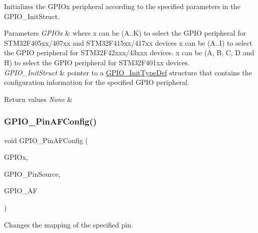 Initializes the G\+P\+I\+Ox peripheral according to the specified parameters in the G\+P\+I\+O\+\_\+\+Init\+Struct. 


\begin{DoxyParams}{Parameters}
{\em G\+P\+I\+Ox} & where x can be (A..K) to select the G\+P\+IO peripheral for S\+T\+M32\+F405xx/407xx and S\+T\+M32\+F415xx/417xx devices x can be (A..I) to select the G\+P\+IO peripheral for S\+T\+M32\+F42xxx/43xxx devices. x can be (A, B, C, D and H) to select the G\+P\+IO peripheral for S\+T\+M32\+F401xx devices. ~\newline
\\
\hline
{\em G\+P\+I\+O\+\_\+\+Init\+Struct} & pointer to a \mbox{\hyperlink{struct_g_p_i_o___init_type_def}{G\+P\+I\+O\+\_\+\+Init\+Type\+Def}} structure that contains the configuration information for the specified G\+P\+IO peripheral. \\
\hline
\end{DoxyParams}

\begin{DoxyRetVals}{Return values}
{\em None} & \\
\hline
\end{DoxyRetVals}
\mbox{\label{group___g_p_i_o_ga0a77617a322562ae84f8d72486032c5d}} 
\subsubsection{\texorpdfstring{G\+P\+I\+O\+\_\+\+Pin\+A\+F\+Config()}{GPIO\_PinAFConfig()}}
{\footnotesize\ttfamily void G\+P\+I\+O\+\_\+\+Pin\+A\+F\+Config (\begin{DoxyParamCaption}\item[{G\+P\+I\+O\+\_\+\+Type\+Def $\ast$}]{G\+P\+I\+Ox,  }\item[{uint16\+\_\+t}]{G\+P\+I\+O\+\_\+\+Pin\+Source,  }\item[{uint8\+\_\+t}]{G\+P\+I\+O\+\_\+\+AF }\end{DoxyParamCaption})}



Changes the mapping of the specified pin. 


